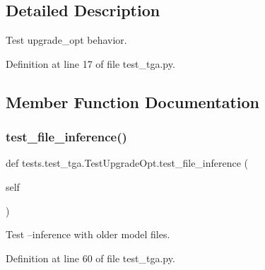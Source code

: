 \subsection{Detailed Description}
\begin{DoxyVerb}Test upgrade_opt behavior.
\end{DoxyVerb}
 

Definition at line 17 of file test\+\_\+tga.\+py.



\subsection{Member Function Documentation}
\mbox{\label{classtests_1_1test__tga_1_1TestUpgradeOpt_a8ba19a5f6b229d7f34a3a8ac022e211b}} 
\subsubsection{\texorpdfstring{test\+\_\+file\+\_\+inference()}{test\_file\_inference()}}
{\footnotesize\ttfamily def tests.\+test\+\_\+tga.\+Test\+Upgrade\+Opt.\+test\+\_\+file\+\_\+inference (\begin{DoxyParamCaption}\item[{}]{self }\end{DoxyParamCaption})}

\begin{DoxyVerb}Test --inference with older model files.
\end{DoxyVerb}
 

Definition at line 60 of file test\+\_\+tga.\+py.


